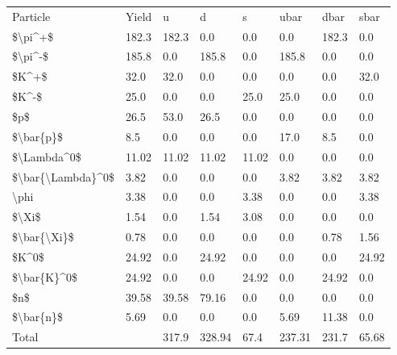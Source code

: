 \begin{tabular}{llllllll}
\hline
 Particle          & Yield & u     & d      & s     & ubar   & dbar  & sbar  \\
 \$\textbackslash{}pi\^{}+\$           & 182.3 & 182.3 & 0.0    & 0.0   & 0.0    & 182.3 & 0.0   \\
 \$\textbackslash{}pi\^{}-\$           & 185.8 & 0.0   & 185.8  & 0.0   & 185.8  & 0.0   & 0.0   \\
 \$K\^{}+\$             & 32.0  & 32.0  & 0.0    & 0.0   & 0.0    & 0.0   & 32.0  \\
 \$K\^{}-\$             & 25.0  & 0.0   & 0.0    & 25.0  & 25.0   & 0.0   & 0.0   \\
 \$p\$               & 26.5  & 53.0  & 26.5   & 0.0   & 0.0    & 0.0   & 0.0   \\
 \$\textbackslash{}bar\{p\}\$         & 8.5   & 0.0   & 0.0    & 0.0   & 17.0   & 8.5   & 0.0   \\
 \$\textbackslash{}Lambda\^{}0\$       & 11.02 & 11.02 & 11.02  & 11.02 & 0.0    & 0.0   & 0.0   \\
 \$\textbackslash{}bar\{\textbackslash{}Lambda\}\^{}0\$ & 3.82  & 0.0   & 0.0    & 0.0   & 3.82   & 3.82  & 3.82  \\
 \textbackslash{}phi              & 3.38  & 0.0   & 0.0    & 3.38  & 0.0    & 0.0   & 3.38  \\
 \$\textbackslash{}Xi\$             & 1.54  & 0.0   & 1.54   & 3.08  & 0.0    & 0.0   & 0.0   \\
 \$\textbackslash{}bar\{\textbackslash{}Xi\}\$       & 0.78  & 0.0   & 0.0    & 0.0   & 0.0    & 0.78  & 1.56  \\
 \$K\^{}0\$             & 24.92 & 0.0   & 24.92  & 0.0   & 0.0    & 0.0   & 24.92 \\
 \$\textbackslash{}bar\{K\}\^{}0\$       & 24.92 & 0.0   & 0.0    & 24.92 & 0.0    & 24.92 & 0.0   \\
 \$n\$               & 39.58 & 39.58 & 79.16  & 0.0   & 0.0    & 0.0   & 0.0   \\
 \$\textbackslash{}bar\{n\}\$         & 5.69  & 0.0   & 0.0    & 0.0   & 5.69   & 11.38 & 0.0   \\
 Total             &       & 317.9 & 328.94 & 67.4  & 237.31 & 231.7 & 65.68 \\
\hline
\end{tabular}